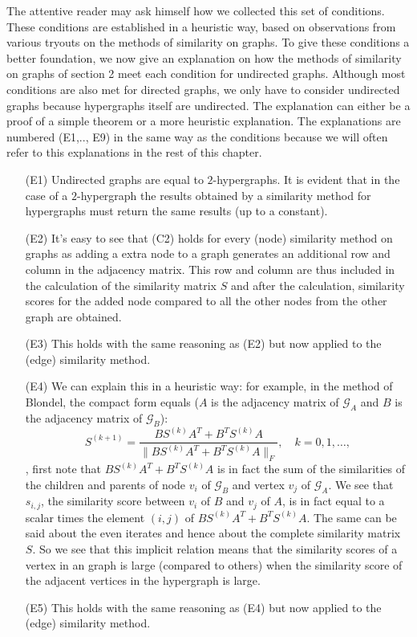 \documentclass[a4paper,11pt]{report}
\newcommand{\graf}{\mathscr{G}}
\begin{document}
The attentive reader may ask himself how we collected this set of conditions. 
These conditions are established in a heuristic way, based on observations from 
various tryouts on the methods of similarity on graphs. To give these conditions 
a better foundation, we now give an explanation on how the methods of similarity on graphs of
section 2 meet each condition for undirected graphs. Although most conditions are also met for
directed graphs,  we only have to consider undirected graphs
because hypergraphs itself are undirected. The explanation can either be a proof of a simple 
theorem or a more heuristic explanation. The explanations are numbered (E1,.., E9) 
in the same way as the conditions because we will often refer to this 
explanations in the rest of this chapter. 

\begin{itemize}
  \item[(E1)] Undirected graphs are equal to $2$-hypergraphs. It is evident that 
  in the case of a $2$-hypergraph the results obtained by a similarity method 
  for hypergraphs must return the same results (up to a constant).
   \item[(E2)] It's easy to see that (C2) holds for every (node) similarity method on 
   graphs as adding a extra node to a graph generates an additional row and 
   column in the adjacency matrix. This row and column are thus included in the 
   calculation of the similarity matrix $S$ and after the calculation, similarity 
   scores for the added node compared to all the other nodes from the other graph are 
   obtained.
  \item[(E3)] This holds with the same reasoning as (E2) but now applied to the (edge) similarity method.
  \item[(E4)] We can explain this in a heuristic way: for example, in the method 
  of Blondel, the compact form equals ($A$ is the adjacency matrix of $\graf_A$ and $B$ is the adjacency
  matrix of $\graf_B$):
  $$S^{(k+1)} = \frac{BS^{(k)}A^T + B^TS^{(k)}A}{\|BS^{(k)}A^T + B^TS^{(k)}A\|_F},\quad 
  k=0,1,\ldots,$$,
first note that $BS^{(k)}A^T + B^TS^{(k)}A$ is in fact the sum of the 
similarities of the children and parents of node $v_i$ of $\graf_B$ and vertex $v_j$ 
of $\graf_A$. We see that $s_{i,j}$, the similarity score between $v_i$ of $B$ and $v_j$ of $A$, is in fact
 equal to a scalar times the element $(i,j)$ of $BS^{(k)}A^T + B^TS^{(k)}A$. The same can be said about the even iterates and hence about
 the complete similarity matrix $S$. So we see that this implicit relation means that the similarity scores
 of a vertex in an graph is large (compared to others) when the similarity score 
  of the adjacent vertices in the hypergraph is large.
  \item[(E5)] This holds with the same reasoning as (E4) but now applied to the (edge) similarity method. 
  


\end{itemize}
\end{document}
